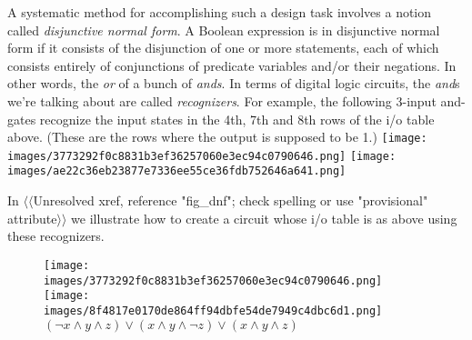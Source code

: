 \documentclass[10pt,]{book}
\theoremstyle{plain}
\theoremstyle{definition}
\theoremstyle{definition}
\numberwithin{equation}{section}
\begin{document}
    A systematic method for accomplishing such a design task involves
    a notion called \emph{disjunctive normal form}.
    A Boolean expression
    is in disjunctive normal form if it consists of the disjunction of
    one or more statements, each of which consists entirely of conjunctions
    of predicate variables and/or their negations. In other words, the \emph{or}
    of a bunch of \emph{ands}. In terms of digital logic circuits, the \emph{and}s
    we're talking about are called \emph{recognizers}.
    For example,
    the following 3-input and-gates recognize the input states in
    the 4th, 7th and 8th rows of the i/o table above. (These are the rows
    where the output is supposed to be 1.)
\texttt{[image: images/3773292f0c8831b3ef36257060e3ec94c0790646.png]}
\texttt{[image: images/ae22c36eb23877e7336ee55ce36fdb752646a641.png]}
\par

    In {$\langle\langle$Unresolved xref, reference "fig\_dnf"; check spelling or use "provisional" attribute$\rangle\rangle$} we illustrate how to create a circuit whose
    i/o table is as above using these recognizers.
\leavevmode%
\begin{figure}
\centering
\texttt{[image: images/3773292f0c8831b3ef36257060e3ec94c0790646.png]}
\texttt{[image: images/8f4817e0170de864ff94dbfe54de7949c4dbc6d1.png]}
\(({\lnot}x \land y \land z) \lor (x \land y \land {\lnot}z) \lor (x \land y \land z)\)\end{figure}
\typeout{************************************************}
\typeout{************************************************}
\end{document}
